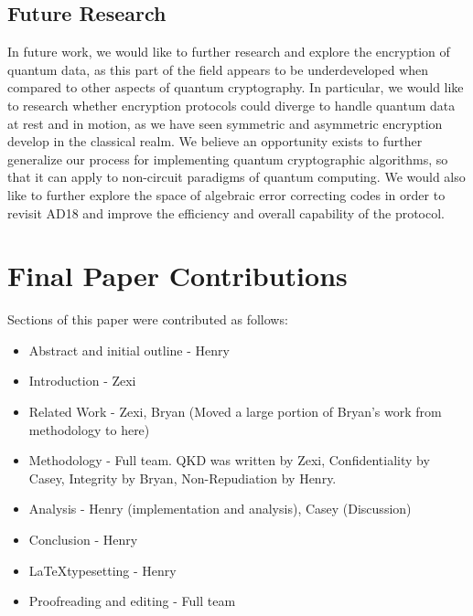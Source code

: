 \documentclass[sigconf]{acmart}
\begin{document}
\subsection{Future Research}
In future work, we would like to further research and explore the encryption of quantum data, as this part of the field appears to be underdeveloped when compared to other aspects of quantum cryptography. In particular, we would like to research whether encryption protocols could diverge to handle quantum data at rest and in motion, as we have seen symmetric and asymmetric encryption develop in the classical realm. We believe an opportunity exists to further generalize our process for implementing quantum cryptographic algorithms, so that it can apply to non-circuit paradigms of quantum computing. We would also like to further explore the space of algebraic error correcting codes in order to revisit AD18 and improve the efficiency and overall capability of the protocol. 

\section{Final Paper Contributions}
Sections of this paper were contributed as follows:
\begin{itemize}
\item Abstract and initial outline - Henry
\item Introduction - Zexi
\item Related Work - Zexi, Bryan (Moved a large portion of Bryan's work from methodology to here)
\item Methodology - Full team. QKD was written by Zexi, Confidentiality by Casey, Integrity by Bryan, Non-Repudiation by Henry.
\item Analysis - Henry (implementation and analysis), Casey (Discussion)
\item Conclusion - Henry
\item \LaTeX typesetting - Henry
\item Proofreading and editing - Full team
\end{itemize}

{}

\end{document}
